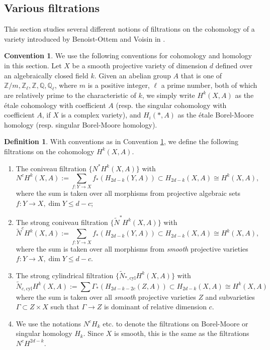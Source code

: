 \documentclass{amsart}
\theoremstyle{definition}
\newtheorem{defn}[theorem]{Definition}
\newtheorem{conv}[theorem]{Convention}
\theoremstyle{remark}
\newcommand{\mbb}{\mathbb}
\newcommand{\QQ}{\mbb{Q}}
\newcommand{\ZZ}{\mbb{Z}}
\newcommand{\cyl}{\text{cyl}}
\begin{document}
\subsection{Various filtrations}\label{sec:coniveau}
This section studies several different notions of filtrations on the cohomology of a variety  introduced by Benoist-Ottem and Voisin in \cite{BO_Coniveau, VoisinConiveau}. 
\begin{conv}\label{conv}
We use the following conventions for cohomology and homology in this section.
Let $X$ be a smooth projective variety of dimension $d$ defined over an algebraically closed field $k$. 
Given an abelian group $A$ that is one of $\ZZ/m, \ZZ_\ell, \ZZ, \QQ, \QQ_\ell$, where $m$ is a positive integer, $\ell$ a prime number, both of which are relatively prime to the characteristic of $k$, we simply write $H^k(X, A)$ as the \'etale cohomology with coefficient $A$ (resp. the singular cohomology with coefficient $A$, if $X$ is a complex variety), and $H_i(*, A)$ as the \'etale Borel-Moore homology (resp. singular Borel-Moore homology).
\end{conv}
\begin{defn}\label{def:filtration}
 With conventions as in Convention \ref{conv}, we define the following filtrations on the cohomology $H^k(X, A)$.
\begin{enumerate}
\item The coniveau filtration $\{N^*H^k(X, A)\}$ with
\[
N^cH^k(X, A):=\sum_{f: Y \to X}f_*(H_{2d-k}(Y, A)) \subset H_{2d-k}(X, A)\cong H^k(X, A), 
\]
where the sum is taken over all morphisms from projective algebraic sets $f: Y \to X, \dim Y \leq d-c$;
\item  The strong coniveau filtration $\{\tilde{N}^*H^k(X, A)\}$ with
\[
\tilde{N}^cH^k(X, A):=\sum_{f: Y \to X}f_*(H_{2d-k}(Y, A)) \subset H_{2d-k}(X, A)\cong H^k(X, A),
\]
where the sum is taken over all morphisms from \textit{smooth} projective varieties $f: Y \to X, \dim Y \leq d-c$.
\item The strong cylindrical filtration $\{\tilde{N}_{*, \cyl}H^k(X, A)\}$ with
\[
\tilde{N}_{c, \cyl}H^{k}(X, A) :=\sum \Gamma_*( H_{2d-k-2c}(Z, A)) \subset H_{2d-k}(X, A) \cong H^k(X, A)
\]
where the sum is taken over all \emph{smooth} projective varieties $Z$ and subvarieties $\Gamma \subset Z\times X$ such that $\Gamma \to Z$ is dominant of relative dimension $c$.





\item We use the notations $N^cH_k$ etc. to denote the filtrations on Borel-Moore or singular homology $H_k$. Since $X$ is smooth, this is the same as the filtrations $N^cH^{2d-k}$. 
\end{enumerate}
\end{defn}
\end{document}
